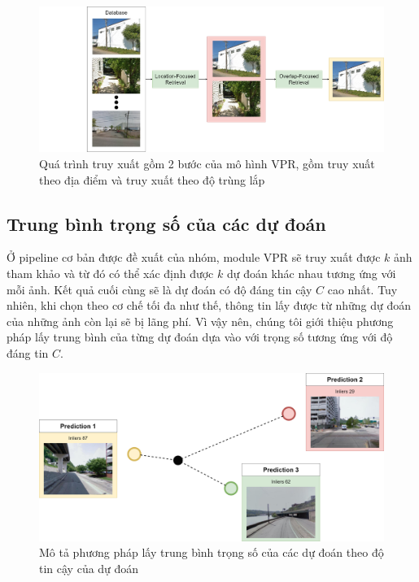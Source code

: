 \begin{figure}
  \centering
  \includegraphics[width=\textwidth]{pics/Proposal/rerank.drawio.png}
  \caption[Quá trình truy xuất 2 bước của VPR]{Quá trình truy xuất gồm 2 bước của mô hình VPR, gồm truy xuất theo địa điểm và truy xuất theo độ trùng lắp}
\end{figure}

\subsection{Trung bình trọng số của các dự đoán}

Ở pipeline cơ bản được đề xuất của nhóm, module VPR sẽ truy xuất được $k$ ảnh tham khảo và từ đó có thể xác định được $k$ dự đoán khác nhau tương ứng với mỗi ảnh. Kết quả cuối cùng sẽ là dự đoán có độ đáng tin cậy $C$ cao nhất. Tuy nhiên, khi chọn theo cơ chế tối đa như thế, thông tin lấy được từ những dự đoán của những ảnh còn lại sẽ bị lãng phí. Vì vậy nên, chúng tôi giới thiệu phương pháp lấy trung bình của từng dự đoán dựa vào với trọng số tương ứng với độ đáng tin $C$.

\begin{figure}[H]
  \centering
  \includegraphics[width=\textwidth]{pics/Proposal/weighted.png}
  \caption[Trung bình trọng số theo inliers của dự đoán]{Mô tả phương pháp lấy trung bình trọng số của các dự đoán theo độ tin cậy của dự đoán}
\end{figure}


